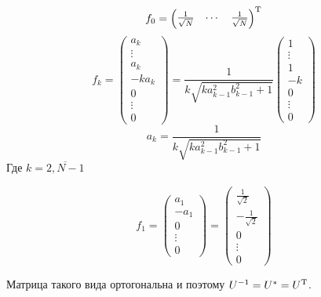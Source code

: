 \begin{lemma}
\begin{minipage}{\textwidth}
    \[f_0 = \begin{pmatrix} \frac{1}{\sqrt N} & \cdots & \frac{1}{\sqrt N} \end{pmatrix}^{\mathrm{T}}\]
    \providecommand{\fknorm}{\sqrt{k a_{k-1}^2 b_{k-1}^2 + 1}}
    \[
        f_k =
        \begin{pmatrix}a_k \\ \vdots \\ a_k \\ -ka_k \\ 0 \\ \vdots \\ 0 \end{pmatrix} =
        \frac{1}{k\fknorm}
        \begin{pmatrix}1 \\ \vdots \\ 1 \\ -k \\ 0 \\ \vdots \\ 0 \end{pmatrix}
        \]
    \[
         a_k = \frac{1}{k\fknorm}
         \]
         Где \( k=\overline{2,N-1} \)

    \[
             f_1
             = \begin{pmatrix}a_1 \\ -a_1 \\ 0 \\ \vdots \\ 0 \end{pmatrix}
             = \begin{pmatrix}\frac1{\sqrt2} \\ - \frac{1}{\sqrt2} \\ 0 \\ \vdots \\ 0 \end{pmatrix}
             \]

    Матрица такого вида ортогональна и поэтому
    \( U^{-1} = U^{\mathrm{*}} = U^{\mathrm{T}} \).
        \end{minipage}
\end{lemma}
